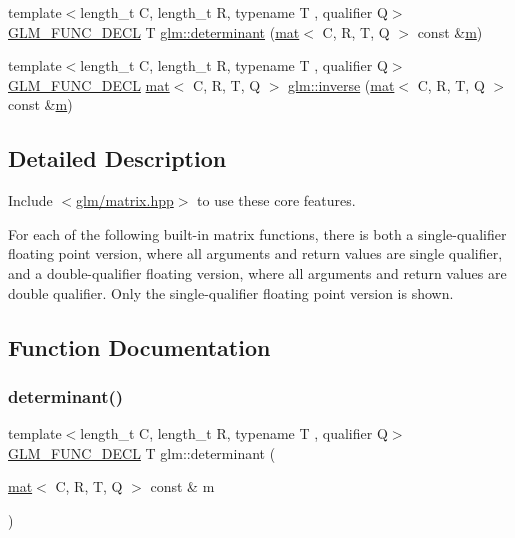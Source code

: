 \begin{DoxyCompactItemize}
\item 
{\footnotesize template$<$length\+\_\+t C, length\+\_\+t R, typename T , qualifier Q$>$ }\\\mbox{\hyperlink{setup_8hpp_ab2d052de21a70539923e9bcbf6e83a51}{G\+L\+M\+\_\+\+F\+U\+N\+C\+\_\+\+D\+E\+CL}} T \mbox{\hyperlink{group__core__func__matrix_gad7928795124768e058f99dce270f5c8d}{glm\+::determinant}} (\mbox{\hyperlink{structglm_1_1mat}{mat}}$<$ C, R, T, Q $>$ const \&\mbox{\hyperlink{_s_d_l__opengl__glext_8h_af593500c283bf1a787a6f947f503a5c2}{m}})
\item 
{\footnotesize template$<$length\+\_\+t C, length\+\_\+t R, typename T , qualifier Q$>$ }\\\mbox{\hyperlink{setup_8hpp_ab2d052de21a70539923e9bcbf6e83a51}{G\+L\+M\+\_\+\+F\+U\+N\+C\+\_\+\+D\+E\+CL}} \mbox{\hyperlink{structglm_1_1mat}{mat}}$<$ C, R, T, Q $>$ \mbox{\hyperlink{group__core__func__matrix_gace61e11fc177491beeca0c6971e2f3fc}{glm\+::inverse}} (\mbox{\hyperlink{structglm_1_1mat}{mat}}$<$ C, R, T, Q $>$ const \&\mbox{\hyperlink{_s_d_l__opengl__glext_8h_af593500c283bf1a787a6f947f503a5c2}{m}})
\end{DoxyCompactItemize}


\subsection{Detailed Description}
Include $<$\mbox{\hyperlink{matrix_8hpp}{glm/matrix.\+hpp}}$>$ to use these core features.

For each of the following built-\/in matrix functions, there is both a single-\/qualifier floating point version, where all arguments and return values are single qualifier, and a double-\/qualifier floating version, where all arguments and return values are double qualifier. Only the single-\/qualifier floating point version is shown. 

\subsection{Function Documentation}
\mbox{\label{group__core__func__matrix_gad7928795124768e058f99dce270f5c8d}} 
\subsubsection{\texorpdfstring{determinant()}{determinant()}}
{\footnotesize\ttfamily template$<$length\+\_\+t C, length\+\_\+t R, typename T , qualifier Q$>$ \\
\mbox{\hyperlink{setup_8hpp_ab2d052de21a70539923e9bcbf6e83a51}{G\+L\+M\+\_\+\+F\+U\+N\+C\+\_\+\+D\+E\+CL}} T glm\+::determinant (\begin{DoxyParamCaption}\item[{\mbox{\hyperlink{structglm_1_1mat}{mat}}$<$ C, R, T, Q $>$ const \&}]{m }\end{DoxyParamCaption})}

